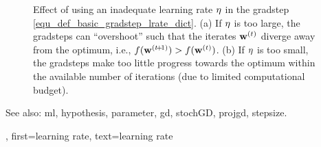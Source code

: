 {{\begin{figure}[H]
\begin{center}
\begin{minipage}{0.45\columnwidth}
			\end{minipage}
			\end{center}
		\caption{Effect of using an inadequate learning rate $\eta$ in the \gls{gradstep} 
			\eqref{equ_def_basic_gradstep_lrate_dict}. (a) If $\eta$ is too large, 
			the \glspl{gradstep} can ``overshoot'' such that the iterates ${\bf w}^{(t)}$ 
			diverge away from the optimum, i.e., $f({\bf w}^{(t\!+\!1)}) > f({\bf w}^{(t)})$. 
			(b) If $\eta$ is too small, the \glspl{gradstep} make too little progress towards 
			the optimum within the available number of \glspl{iteration} (due to limited computational budget). 
			\label{fig_small_large_lrate_dict}}
		\end{figure}
		See also: \gls{ml}, \gls{hypothesis}, \gls{parameter}, \gls{gd}, \gls{stochGD}, \gls{projgd}, \gls{stepsize}.},
	first={learning rate},
	text={learning rate} 
}

